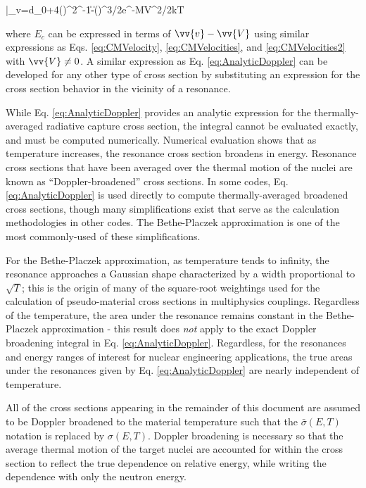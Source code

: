 \beq
\label{eq:AnalyticDoppler}
\bar{\sigma}_\gamma v=\int d\sigma_0\frac{\Gamma_\gamma}{\Gamma}\left{}+4\left(\right)^2\right\rbrack^{-1}\|-\|\left(\right)^{3/2}e^{-MV^2/2kT}
\eeq

where \(E_c\) can be expressed in terms of \(\vv{v}-\vv{V}\) using similar expressions as Eqs. \eqref{eq:CMVelocity}, \eqref{eq:CMVelocities}, and \eqref{eq:CMVelocities2} with \(\vv{V}\neq0\). A similar expression as Eq. \eqref{eq:AnalyticDoppler} can be developed for any other type of cross section by substituting an expression for the cross section behavior in the vicinity of a resonance. 

While Eq. \eqref{eq:AnalyticDoppler} provides an analytic expression for the thermally-averaged radiative capture cross section, the integral cannot be evaluated exactly, and must be computed numerically. Numerical evaluation shows that as temperature increases, the resonance cross section broadens in energy. Resonance cross sections that have been averaged over the thermal motion of the nuclei are known as ``Doppler-broadened'' cross sections. In some codes, Eq. \eqref{eq:AnalyticDoppler} is used directly to compute thermally-averaged broadened cross sections, though many simplifications exist that serve as the calculation methodologies in other codes. The Bethe-Placzek approximation is one of the most commonly-used of these simplifications. 

For the Bethe-Placzek approximation, as temperature tends to infinity, the resonance approaches a Gaussian shape characterized by a width proportional to \(\sqrt{T}\); this is the origin of many of the square-root weightings used for the calculation of pseudo-material cross sections in multiphysics couplings. Regardless of the temperature, the area under the resonance remains constant in the Bethe-Placzek approximation - this result does {\it not} apply to the exact Doppler broadening integral in Eq. \eqref{eq:AnalyticDoppler}. Regardless, for the resonances and energy ranges of interest for nuclear engineering applications, the true areas under the resonances given by Eq. \eqref{eq:AnalyticDoppler} are nearly independent of temperature. 

All of the cross sections appearing in the remainder of this document are assumed to be Doppler broadened to the material temperature such that the \(\bar{\sigma}(E,T)\) notation is replaced by \(\sigma(E,T)\). Doppler broadening is necessary so that the average thermal motion of the target nuclei are accounted for within the cross section to reflect the true dependence on relative energy, while writing the dependence with only the neutron energy.

